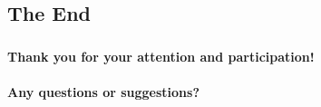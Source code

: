 \documentclass{beamer}
\newcommand{\BLUE}[1]{\textcolor[rgb]{0.192,0.204,0.709}{#1}}
\begin{document}
\subsection<presentation>[The End]{The End}
\begin{frame}
  \frametitle<presentation>[Thank you!]{}
  \begin{center} 
      \textbf{\Large Thank you for your attention and participation!}
\\$ $\\
      \textbf{\normalsize \BLUE{Any questions or suggestions?}} \\
      
  \end{center}
\end{frame}

\end{document}
